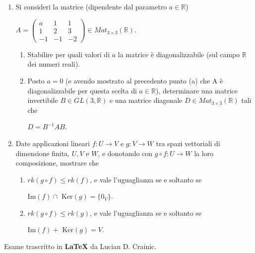 \documentclass[fleqn]{article}
\begin{document}
\begin{enumerate}
   \item Si consideri la matrice (dipendente dal parametro $a \in \mathbb{R}$)
   \begin{center}
   $A = \begin{pmatrix}
         a & 1 & 1  \\
         1 & 2 & 3  \\
         -1 & -1 & -2 
      \end{pmatrix}
      \in Mat_{3 \times 3}(\mathbb{R}).$
   \end{center}
   \begin{enumerate}
      \item Stabilire per quali valori di $a$ la matrice è diagonalizzabile (sul campo $\mathbb{R}$ 
      dei numeri reali).
      \item Posto $a=0$ (e avendo mostrato al precedento punto (a) che A è diagonalizzabile per questa scelta
      di $a \in \mathbb{R}$), determinare una matrice invertibile $B \in GL(3,\mathbb{R})$ e una matrice diagonale 
      $D \in Mat_{3 \times 3}(\mathbb{R})$ tali che 
      \begin{center}
      $D=B^{-1}AB$.
      \end{center}
   \end{enumerate}

   \item Date applicazioni lineari $f:U \rightarrow V$ e $g:V \rightarrow W$ tra spazi vettoriali di 
   dimensione finita, $U,V$ e $W$, e donotando con $g \circ f : U \rightarrow W$ la loro composizione, mostrare che
   \begin{enumerate}
      \item $rk(g \circ f) \leq rk(f)$, e vale l'uguaglianza se e soltanto se
      \begin{center}
          Im$(f) \cap $ Ker$(g) = \{ 0_V \}$.
      \end{center}
      \item $rk(g \circ f) \leq rk(g)$, e vale l'uguaglianza se e soltanto se
      \begin{center}
         Im$(f) + $ Ker$(g) = V$.
      \end{center}
   \end{enumerate}

\end{enumerate}
Esame trascritto in \textbf{\LaTeX} da Lucian D. Crainic.
\end{document}
